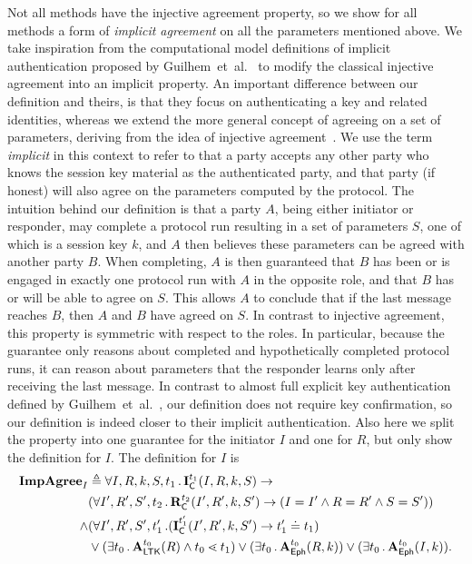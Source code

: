 Not all \mEdhoc{} methods have the injective agreement property, so we show
for all methods a form of \emph{implicit agreement} on all the parameters
mentioned above.
%
We take inspiration from the computational model definitions of implicit
authentication proposed by Guilhem~et~al.~\cite{DBLP:conf/csfw/GuilhemFW20} to
modify the classical injective agreement into an implicit property.
%
An important difference between our definition and theirs, is that they focus on
authenticating a key and related identities, whereas we extend the more general
concept of agreeing on a set of parameters, deriving from the idea of injective
agreement~\cite{DBLP:conf/csfw/Lowe97a}.
%
We use the term \emph{implicit} in this context to refer to that a party
accepts any other party who knows the session key material as the
authenticated party, and that party (if honest) will also agree on the
parameters computed by the protocol.
%
The intuition behind our definition is that a party $A$, being either initiator
or responder, may complete a protocol
run resulting in a set of parameters $S$, one of which is a session key $k$,
and $A$ then believes these parameters can be agreed with another party $B$.
%
When completing, $A$ is then guaranteed that $B$ has been or is
engaged in exactly one protocol run with $A$ in the opposite role, and that $B$
has or will be able to agree on $S$.
%
This allows $A$ to conclude that if the last message reaches $B$, then
$A$ and $B$ have agreed on $S$.
%
In contrast to injective agreement, this property is symmetric with respect to
the roles.
%
In particular, because the guarantee only reasons about completed and
hypothetically completed protocol runs, it can reason about parameters that the
responder learns only after receiving the last message.
%
In contrast to almost full explicit key authentication defined by
Guilhem~et~al.~\cite{DBLP:conf/csfw/GuilhemFW20}, our definition does not
require key confirmation, so our definition is indeed closer to their implicit
authentication.
%
Also here we split the property into one guarantee for the initiator $I$ and
one for $R$, but only show the definition for $I$.
%
The definition for $I$ is
\begin{align*}
    \mathbf{ImpAgree}_I& \triangleq
    \forall I, R, k, S, t_1\operatorname{.} \mathbf{I}_{\textsf{C}}^{t_1}(I, R, k, S)
    \rightarrow\\
      &(\forall I', R', S', t_2\operatorname{.} \mathbf{R}_{\textsf{C}}^{t_2}(I', R', k, S') \rightarrow
             (I=I' \land R=R' \land S=S'))\\
      \land &(\forall I', R', S', t_1'\operatorname{.}
        (\mathbf{I}_{\textsf{C}}^{t_1'}(I', R', k, S') \rightarrow t_1' \doteq t_1
        )\\
    &\lor(\exists t_0\operatorname{.} \mathbf{A}_{\textsf{LTK}}^{t_0}(R) \land t_0 \lessdot t_1)
    \lor(\exists t_0\operatorname{.} \mathbf{A}_{\textsf{Eph}}^{t_0}(R, k))
    \lor(\exists t_0\operatorname{.} \mathbf{A}_{\textsf{Eph}}^{t_0}(I, k)).
\end{align*}
